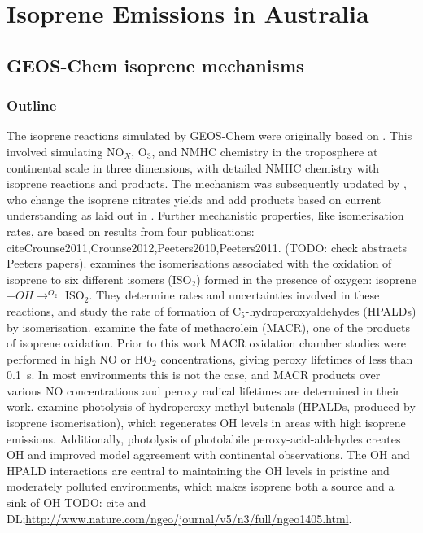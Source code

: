
\chapter{Isoprene Emissions in Australia} %
\label{ch_isop}

\section{GEOS-Chem isoprene mechanisms}
\label{ch_isop:sec:GEOSChemMechanisms}
  \subsection{Outline}
    The isoprene reactions simulated by GEOS-Chem were originally based on \cite{Horowitz1998}.
    This involved simulating NO$_X$, O$_3$, and NMHC chemistry in the troposphere at continental scale in three dimensions, with detailed NMHC chemistry with isoprene reactions and products.
    The mechanism was subsequently updated by \citet{Mao2013}, who change the isoprene nitrates yields and add products based on current understanding as laid out in \citet{Paulot2009a,Paulot2009b}.
    Further mechanistic properties, like isomerisation rates, are based on results from four publications: cite{Crounse2011,Crounse2012,Peeters2010,Peeters2011}.
    (TODO: check abstracts Peeters papers).
    \cite{Crounse2011} examines the isomerisations associated with the oxidation of isoprene to six different isomers (ISO$_2$) formed in the presence of oxygen: isoprene $ + OH \rightarrow^{O_2} $ ISO$_2$.
    They determine rates and uncertainties involved in these reactions, and study the rate of formation of C$_5$-hydroperoxyaldehydes (HPALDs) by isomerisation.
    \cite{Crounse2012} examine the fate of methacrolein (MACR), one of the products of isoprene oxidation. 
    Prior to this work MACR oxidation chamber studies were performed in high NO or HO$_2$ concentrations, giving peroxy lifetimes of less than 0.1~s.
    In most environments this is not the case, and MACR products over various NO concentrations and peroxy radical lifetimes are determined in their work.
    \cite{Peeters2010} examine photolysis of hydroperoxy-methyl-butenals (HPALDs, produced by isoprene isomerisation), which regenerates OH levels in areas with high isoprene emissions.
    Additionally, photolysis of photolabile peroxy-acid-aldehydes creates OH and improved model aggreement with continental observations.
   The OH and HPALD interactions are central to maintaining the OH levels in pristine and moderately polluted environments, which makes isoprene both a source and a sink of OH TODO: cite and DL;\url{http://www.nature.com/ngeo/journal/v5/n3/full/ngeo1405.html}.
    
